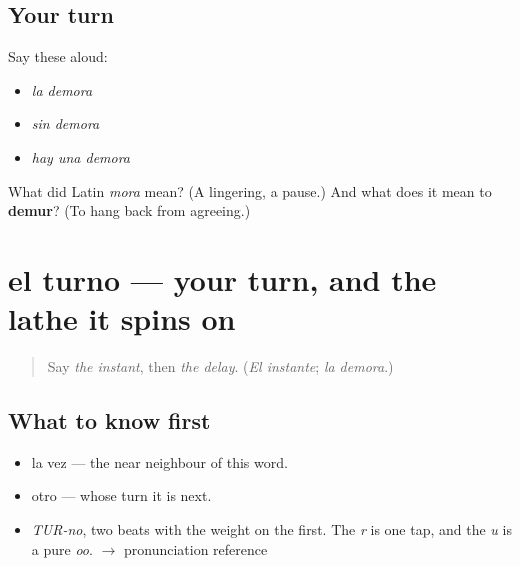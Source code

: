 \subsection*{Your turn}
Say these aloud:

\begin{itemize}
\raggedright
  \item \emph{la demora}
  \item \emph{sin demora}
  \item \emph{hay una demora}
\end{itemize}

\begin{tcolorbox}[breakable,colback=teal!4,colframe=teal!35!black,title={Before you move on}]
What did Latin \emph{mora} mean? (A lingering, a pause.) And what does it mean to \textbf{demur}? (To hang back from agreeing.)
\end{tcolorbox}
\section[el turno]{el turno — your turn, and the lathe it spins on}

\label{lesson:ES-C348-turno}



\begin{quote}
Say \emph{the instant}, then \emph{the delay}. (\emph{El instante}; \emph{la demora}.)
\end{quote}

\subsection*{What to know first}
\begin{itemize}
\raggedright
  \item la vez — the near neighbour of this word.
  \item otro — whose turn it is next.
\end{itemize}

\begin{sounds}
\begin{itemize}
\raggedright
  \item \emph{TUR-no}, two beats with the weight on the first. The \emph{r} is one tap, and the \emph{u} is a pure \emph{oo}. $\to$ pronunciation reference
\end{itemize}
\end{sounds}

